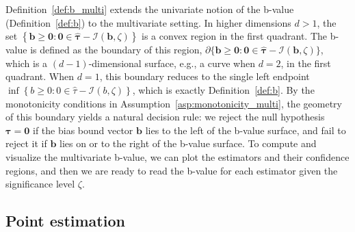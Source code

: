 \documentclass[11pt]{article}
\def\cI{{\mathcal I}}
\numberwithin{equation}{section}
\theoremstyle{definition}
\begin{document}
Definition~\ref{def:b_multi} extends the univariate notion of the b-value (Definition~\ref{def:b}) to the multivariate setting. In higher dimensions $d > 1$, the set $\left\{\bm{b} \ge \bm{0}: \bm{0} \in \bm{\hat\tau} - \bm{\cI}(\bm{b}, \zeta)\right\}$ is a convex region in the first quadrant. The b-value is defined as the boundary of this region, $\partial\{\bm{b} \ge \bm{0}: \bm{0} \in \bm{\hat\tau} - \bm{\cI}(\bm{b}, \zeta)\}$, which is a $(d-1)$-dimensional surface, e.g., a curve when $d=2$, in the first quadrant. When $d=1$, this boundary reduces to the single left endpoint $\inf\left\{b \ge 0: 0 \in \hat\tau - \cI(b, \zeta)\right\}$, which is exactly Definition~\ref{def:b}. By the monotonicity conditions in Assumption~\ref{asp:monotonicity_multi}, the geometry of this boundary yields a natural decision rule: we reject the null hypothesis $\bm{\tau} = \bm{0}$ if the bias bound vector $\bm{b}$ lies to the left of the b-value surface, and fail to reject it if $\bm{b}$ lies on or to the right of the b-value surface. To compute and visualize the multivariate b-value, we can plot the estimators and their confidence regions, and then we are ready to read the b-value for each estimator given the significance level $\zeta$.



\subsection{Point estimation}\label{sec:point_multi}
\end{document}
